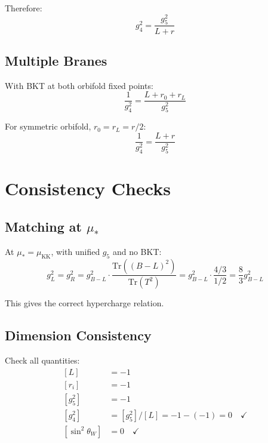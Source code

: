 \documentclass[11pt,a4paper]{article}
\begin{document}
Therefore:
\begin{equation}
\label{eq:g4-bkt-derive}
g_4^2 = \frac{g_5^2}{L + r}
\end{equation}

\subsection{Multiple Branes}
\label{app:multi-brane}

With BKT at both orbifold fixed points:
\begin{equation}
\label{eq:two-branes}
\frac{1}{g_4^2} = \frac{L + r_0 + r_L}{g_5^2}
\end{equation}

For symmetric orbifold, $r_0 = r_L = r/2$:
\begin{equation}
\label{eq:symmetric-bkt}
\frac{1}{g_4^2} = \frac{L + r}{g_5^2}
\end{equation}

\section{Consistency Checks}
\label{app:consistency}

\subsection{Matching at $\mu_*$}
\label{app:matching-check}

At $\mu_* = \mu_{\text{KK}}$, with unified $g_5$ and no BKT:
\begin{equation}
\label{eq:unified-check}
g_L^2 = g_R^2 = g_{B-L}^2 \cdot \frac{\mathrm{Tr}((B-L)^2)}{\mathrm{Tr}(T^2)} = g_{B-L}^2 \cdot \frac{4/3}{1/2} = \frac{8}{3} g_{B-L}^2
\end{equation}

This gives the correct hypercharge relation.

\subsection{Dimension Consistency}
\label{app:dim-consistency}

Check all quantities:
\begin{align}
\label{eq:dim-L}
[L] &= -1 \\
\label{eq:dim-r}
[r_i] &= -1 \\
\label{eq:dim-g5sq}
[g_5^2] &= -1 \\
\label{eq:dim-g4sq}
[g_4^2] &= [g_5^2]/[L] = -1 - (-1) = 0 \quad \checkmark \\
\label{eq:dim-sin2}
[\sin^2\theta_W] &= 0 \quad \checkmark
\end{align}
\end{document}
